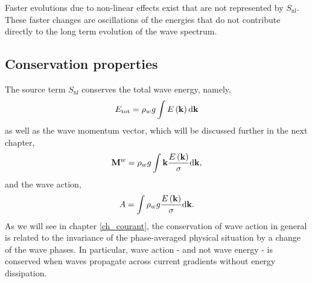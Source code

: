 Faster evolutions due to non-linear effects exist that are not represented by $S_{\mathrm{nl}}$. These faster changes are oscillations of the energies that 
do not contribute directly to the long term evolution of the wave spectrum. 

\subsection{Conservation properties}
The source term $S_{\mathrm{nl}}$ conserves the total wave energy, namely, 
\begin{equation}
E_{\mathrm{tot}}=\rho_w g \int E\left(\mathbf{k}\right){\mathrm d}\mathbf{k}
\end{equation}
as well as the wave momentum vector, which will be discussed further in the next chapter, 
\begin{equation}
\mathbf M^w=\rho_w g  \int
\mathbf{k} \frac{E\left(\mathbf{k}\right)}{\sigma} {\mathrm d}{\mathbf
k},
\end{equation}
and the wave action, 
\begin{equation}
A=\int  \rho_w g \frac{E\left(\mathbf{k}\right)}{\sigma}
{\mathrm d}\mathbf{k}.
\end{equation}
As we will see in chapter \ref{ch_courant}, the conservation of wave action in general is related to the invariance of the phase-averaged physical situation by 
a change of the wave phases. In particular, wave action - and not wave energy - is conserved when waves propagate across current gradients without energy dissipation. 

